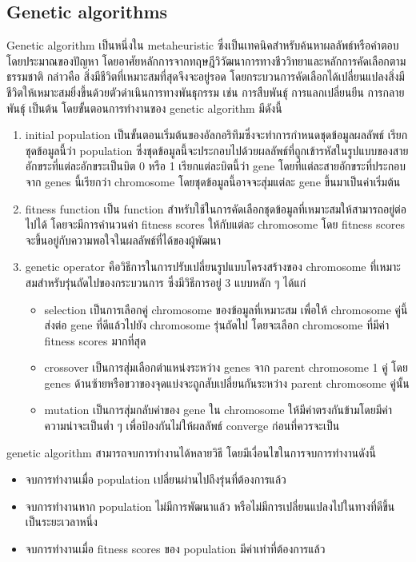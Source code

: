 \subsection{Genetic algorithms}
Genetic algorithm เป็นหนึ่งใน metaheuristic ซึ่งเป็นเทคนิคสำหรับค้นหาผลลัพธ์หรือคำตอบโดยประมาณของปัญหา โดยอาศัยหลักการจากทฤษฎีวิวัฒนาการทางชีววิทยาและหลักการคัดเลือกตามธรรมชาติ 
\linebreak กล่าวคือ สิ่งมีชีวิตที่เหมาะสมที่สุดจึงจะอยู่รอด โดยกระบวนการคัดเลือกได้เปลี่ยนแปลงสิ่งมีชีวิตให้เหมาะสมยิ่งขึ้นด้วยตัวดำเนินการทางพันธุกรรม เช่น การสืบพันธุ์ การแลกเปลี่ยนยีน การกลายพันธุ์ เป็นต้น โดยขั้นตอนการทำงานของ genetic algorithm มีดังนี้ 
\begin{enumerate}
  \item initial population เป็นขั้นตอนเริ่มต้นของอัลกอริทึมซึ่งจะทำการกำหนดชุดข้อมูลผลลัพธ์ เรียกชุดข้อมูลนี้ว่า population ซึ่งชุดข้อมูลนี้จะประกอบไปด้วยผลลัพธ์ที่ถูกเข้ารหัสในรูปแบบของสายอักขระที่แต่ละอักขระเป็นบิต 0 หรือ 1 เรียกแต่ละบิตนี้ว่า gene
  โดยที่แต่ละสายอักขระที่ประกอบจาก genes นี้เรียกว่า chromosome โดยชุดข้อมูลนี้อาจจะสุ่มแต่ละ gene ขึ้นมาเป็นค่าเริ่มต้น
  \item fitness function เป็น function สำหรับใช้ในการคัดเลือกชุดข้อมูลที่เหมาะสมให้สามารถอยู่ต่อไปได้ โดยจะมีการคำนวนค่า fitness scores ให้กับแต่ละ chromosome
  โดย fitness scores จะขึ้นอยู่กับความพอใจในผลลัพธ์ที่ได้ของผู้พัฒนา
  \item genetic operator คือวิธีการในการปรับเปลี่ยนรูปแบบโครงสร้างของ chromosome ที่เหมาะสมสำหรับรุ่นถัดไปของกระบวนการ ซึ่งมีวิธีการอยู่ 3 แบบหลัก ๆ ได้แก่
  \begin{itemize}
  \item selection เป็นการเลือกคู่ chromosome ของข้อมูลที่เหมาะสม เพื่อให้ chromosome คู่นี้ส่งต่อ gene ที่ดีแล้วไปยัง chromosome รุ่นถัดไป โดยจะเลือก chromosome ที่มีค่า fitness scores มากที่สุด
  \item crossover เป็นการสุ่มเลือกตำแหน่งระหว่าง genes จาก parent chromosome 1 คู่ โดย genes ด้านซ้ายหรือขวาของจุดแบ่งจะถูกสับเปลี่ยนกันระหว่าง parent chromosome คู่นั้น
  \item mutation เป็นการสุ่มกลับค่าของ gene ใน chromosome ให้มีค่าตรงกันข้ามโดยมีค่าความน่าจะเป็นต่ำ ๆ เพื่อป้องกันไม่ให้ผลลัพธ์ converge ก่อนที่ควรจะเป็น
\end{itemize}
\end{enumerate}
genetic algorithm สามารถจบการทำงานได้หลายวิธี โดยมีเงื่อนไขในการจบการทำงานดังนี้
\begin{itemize}
  \item จบการทำงานเมื่อ population เปลี่ยนผ่านไปถึงรุ่นที่ต้องการแล้ว 
  \item จบการทำงานหาก population ไม่มีการพัฒนาแล้ว หรือไม่มีการเปลี่ยนแปลงไปในทางที่ดีขึ้นเป็นระยะเวลาหนึ่ง
  \item จบการทำงานเมื่อ fitness scores ของ population มีค่าเท่าที่ต้องการแล้ว
\end{itemize}
